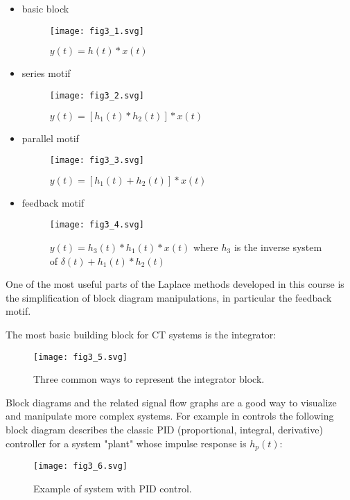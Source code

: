 \documentclass{article}
\begin{document}
\begin{itemize}
\item basic block
    \begin{figure}
    \centering
    \texttt{[image: fig3\_1.svg]}
    \caption{$y(t) = h(t)*x(t)$}
  \end{figure}
  \item series motif
    \begin{figure}
    \centering
    \texttt{[image: fig3\_2.svg]}
    \caption{$y(t) = [h_1(t)*h_2(t)]*x(t)$}
    \end{figure}
  \item parallel motif
    \begin{figure}
    \centering
    \texttt{[image: fig3\_3.svg]}
    \caption{$y(t) = [h_1(t) + h_2(t)]*x(t)$}
    \end{figure}
  \item feedback motif
    \begin{figure}
      \centering
    \texttt{[image: fig3\_4.svg]}
    \caption{$y(t) = h_3(t)*h_1(t)*x(t)$ where $h_3$ is the inverse system of $\delta(t) + h_1(t)*h_2(t)$}
    \end{figure}
\end{itemize}

One of the most useful parts of the Laplace methods developed in this course is the simplification of block diagram manipulations, in particular the feedback motif.

The most basic building block for CT systems is the integrator:

\begin{figure}
  \centering
  \texttt{[image: fig3\_5.svg]}
  \caption{Three common ways to represent the integrator block.}
\end{figure}
    
Block diagrams and the related signal flow graphs are a good way to visualize and manipulate more complex systems. For example in controls the following block diagram describes the classic PID (proportional, integral, derivative) controller for a system "plant" whose impulse response is $h_p(t)$:

\begin{figure}
  \centering
  \texttt{[image: fig3\_6.svg]}
  \caption{Example of system with PID control.}
\end{figure}
\end{document}
